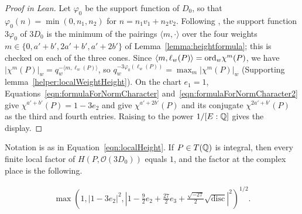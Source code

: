 \begin{proof}[Proof in Lean]

\leanok


Let $\varphi_0$ be the support function of $D_0$, so that $\varphi_0(n)=\min(0,n_1,n_2)$ for $n=n_1v_1+n_2v_2$. Following \cite[p.~68]{MR1234037}, the support function $3\varphi_0$ of $3D_0$ is the minimum of the pairings $\langle m,\cdot\rangle$ over the four weights $m\in\{0,a'+b',2a'+b',a'+2b'\}$ of Lemma~\ref{lemma:heightformula}; this is checked on each of the three cones. Since $\langle m,\ell_w(P)\rangle=\mathrm{ord}_w\chi^m(P)$, we have $|\chi^m(P)|_w=q_w^{-\langle m,\ell_w(P)\rangle}$, so $q_w^{-3\varphi_0(\ell_w(P))}=\max_m|\chi^m(P)|_w$ (Supporting lemma~\ref{helper:localWeightHeight}). On the chart $e_1=1$, Equations~\ref{eqn:formulaForNormCharacter} and~\ref{eqn:formulaForNormCharacter2} give $\chi^{a'+b'}(P)=1-3e_2$ and give $\chi^{a'+2b'}(P)$ and its conjugate $\chi^{2a'+b'}(P)$ as the third and fourth entries. Raising to the power $1/[E:\mathbb{Q}]$ gives the display.

\end{proof}

\begin{equationnode}

\label{eqn:heightExtraFactor}


\leanok

Notation is as in Equation~\ref{eqn:localHeight}. If $P\in T(\mathbb{Q})$ is integral, then every finite local factor of $H(P,\mathcal O(3D_0))$ equals $1$, and the factor at the complex place is the following.

\begin{align*} \max\left( 1, |1-3e_2|^2, \left|1-\tfrac 92 e_2+ \tfrac{27}{2} e_3 + \tfrac{\sqrt{-27}}{2} \sqrt{\mathrm{disc}}\right|^2 \right)^{1/2}. \end{align*}

\end{equationnode}


